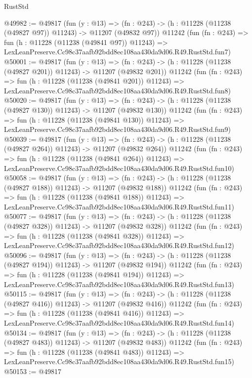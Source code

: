 \begin{lexlean}{RustStd}
\begin{coremodule}
@49982 := @49817
    (fun (y : @13) =>
    (fn : @243) -> (h : @11228 (@11238 (@49827 @97)) @11243) -> @11207 (@49832 @97))
    @11242
    (fun (fn : @243) =>
    fun (h : @11228 (@11238 (@49841 @97)) @11243) =>
    LexLeanPreserve.Cc98c37aafb92bdd8ec108aa430da9d06.R49.RustStd.fun7)
@50001 := @49817
    (fun (y : @13) =>
    (fn : @243) -> (h : @11228 (@11238 (@49827 @201)) @11243) -> @11207 (@49832 @201))
    @11242
    (fun (fn : @243) =>
    fun (h : @11228 (@11238 (@49841 @201)) @11243) =>
    LexLeanPreserve.Cc98c37aafb92bdd8ec108aa430da9d06.R49.RustStd.fun8)
@50020 := @49817
    (fun (y : @13) =>
    (fn : @243) -> (h : @11228 (@11238 (@49827 @130)) @11243) -> @11207 (@49832 @130))
    @11242
    (fun (fn : @243) =>
    fun (h : @11228 (@11238 (@49841 @130)) @11243) =>
    LexLeanPreserve.Cc98c37aafb92bdd8ec108aa430da9d06.R49.RustStd.fun9)
@50039 := @49817
    (fun (y : @13) =>
    (fn : @243) -> (h : @11228 (@11238 (@49827 @264)) @11243) -> @11207 (@49832 @264))
    @11242
    (fun (fn : @243) =>
    fun (h : @11228 (@11238 (@49841 @264)) @11243) =>
    LexLeanPreserve.Cc98c37aafb92bdd8ec108aa430da9d06.R49.RustStd.fun10)
@50058 := @49817
    (fun (y : @13) =>
    (fn : @243) -> (h : @11228 (@11238 (@49827 @188)) @11243) -> @11207 (@49832 @188))
    @11242
    (fun (fn : @243) =>
    fun (h : @11228 (@11238 (@49841 @188)) @11243) =>
    LexLeanPreserve.Cc98c37aafb92bdd8ec108aa430da9d06.R49.RustStd.fun11)
@50077 := @49817
    (fun (y : @13) =>
    (fn : @243) -> (h : @11228 (@11238 (@49827 @328)) @11243) -> @11207 (@49832 @328))
    @11242
    (fun (fn : @243) =>
    fun (h : @11228 (@11238 (@49841 @328)) @11243) =>
    LexLeanPreserve.Cc98c37aafb92bdd8ec108aa430da9d06.R49.RustStd.fun12)
@50096 := @49817
    (fun (y : @13) =>
    (fn : @243) -> (h : @11228 (@11238 (@49827 @194)) @11243) -> @11207 (@49832 @194))
    @11242
    (fun (fn : @243) =>
    fun (h : @11228 (@11238 (@49841 @194)) @11243) =>
    LexLeanPreserve.Cc98c37aafb92bdd8ec108aa430da9d06.R49.RustStd.fun13)
@50115 := @49817
    (fun (y : @13) =>
    (fn : @243) -> (h : @11228 (@11238 (@49827 @416)) @11243) -> @11207 (@49832 @416))
    @11242
    (fun (fn : @243) =>
    fun (h : @11228 (@11238 (@49841 @416)) @11243) =>
    LexLeanPreserve.Cc98c37aafb92bdd8ec108aa430da9d06.R49.RustStd.fun14)
@50134 := @49817
    (fun (y : @13) =>
    (fn : @243) -> (h : @11228 (@11238 (@49827 @483)) @11243) -> @11207 (@49832 @483))
    @11242
    (fun (fn : @243) =>
    fun (h : @11228 (@11238 (@49841 @483)) @11243) =>
    LexLeanPreserve.Cc98c37aafb92bdd8ec108aa430da9d06.R49.RustStd.fun15)
@50153 := @49817

\end{coremodule}
\end{lexlean}
